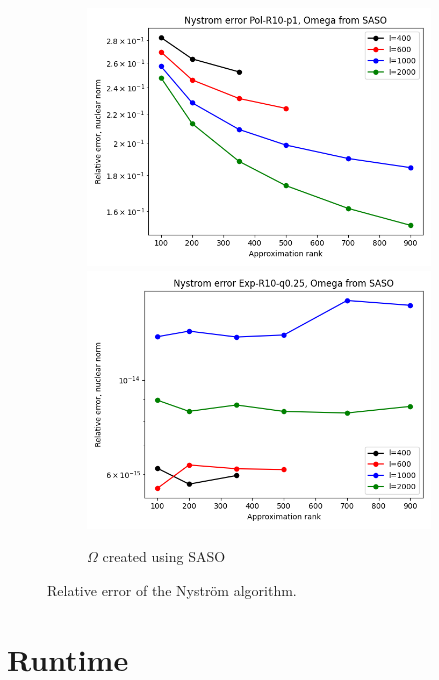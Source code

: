 \documentclass{article}
\theoremstyle{definition}
\begin{document}
\begin{figure}
\begin{subfigure}[t]{0.4\textwidth}
    \includegraphics[width=\textwidth]{plots/relerror/relerror_Pol-R10-p1_SASO.png}
    \includegraphics[width=\textwidth]{plots/relerror/relerror_Exp-R10-q0.25_SASO.png}
    \caption{$\Omega$ created using SASO}
\end{subfigure}\hfill
\caption{Relative error of the Nyström algorithm.}
\label{fig:RelError}
\end{figure}

\section{Runtime} \label{sec:performance}
\end{document}

